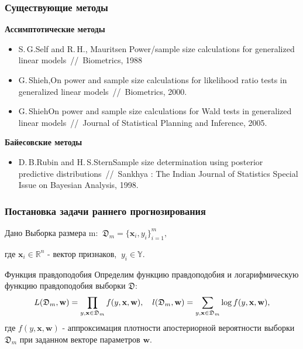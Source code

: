 \documentclass{beamer}
\begin{document}
\begin{frame}
\frametitle{Существующие методы}

\textbf{Ассимптотические методы}

\begin{itemize}
  \item S.\,G.\;Self and R.\,H.,\; Mauritsen Power/sample size calculations for generalized linear
models~//~Biometrics, 1988
  \item G.\,Shieh,\;On power and sample size calculations for likelihood ratio tests in generalized linear models~//~Biometrics, 2000.
  \item G.\,Shieh\;On power and sample size calculations for Wald tests in generalized linear models~//~Journal of Statistical Planning and Inference, 2005.
\end{itemize}

\textbf{Байесовские методы}

\begin{itemize}
  \item D.\,B.\;Rubin and H.\,S.\;Stern\;Sample size determination using posterior predictive distributions~//~Sankhya : The Indian Journal of Statistics Special Issue on Bayesian Analysis, 1998.
\end{itemize}

\end{frame}

\begin{frame}
\frametitle{Постановка задачи раннего прогнозирования}
\begin{block}{Дано}
Выборка размера m: $~\mathfrak D_m = \{\textbf{x}_i, y_i\}_{i=1}^m,$

где $\textbf{x}_i \in \mathbb{R}^{n}$ - вектор признаков, $~y_i \in \mathbb{Y}$.
\end{block}
\begin{block}{Функция правдоподобия}
Определим функцию правдоподобия и логарифмическую функцию правдоподобия выборки $\mathfrak D$:
$$
L(\mathfrak D_m, \textbf{w}) = \prod_{y, \textbf{x} \in \mathfrak D_m} f(y, \textbf{x}, \textbf{w}),~~~ l(\mathfrak D_m, \textbf w) = \sum_{y, \textbf{x} \in \mathfrak D_m}\log f(y, \textbf{x}, \textbf{w}),
$$
где $f(y, \textbf{x}, \textbf{w})$ - аппроксимация плотности апостериорной вероятности выборки $\mathfrak D_m$ при заданном векторе параметров $\textbf{w}$.
\end{block}
\end{frame}
\end{document}
